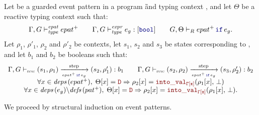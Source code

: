 \begin{skippableproof}
    Let  be a guarded event pattern in a program \G and typing
    context \tyCtx, and let $\Theta$ be a reactive typing context such that:
    \begin{equation*}
        \epatTyped{epat^+} \qquad \exprTyped{e_g}{\kwf{bool}} \qquad \epatTypedReact{\Theta}{\guarded{epat^+}{e_g}}.
    \end{equation*}
    Let $\rho_1$, $\rho'_1$, $\rho_2$ and $\rho'_2$ be contexts, let $s_1$, $s_2$ and $s_3$ be
    states corresponding to , and let $b_1$ and $b_2$ be booleans such that:
    \begin{equation*}
        \begin{array}{c}
            \epatOpsem{\rho_1}{s_1}{\guarded{epat^+}{e_g}}{s_2}{b_1}{\rho'_1} \qquad \epatOpsem{\rho_2}{s_2}{\guarded{epat^+}{e_g}}{s_3}{b_2}{\rho'_2} \\
            \forall x \in \deps{epat^+}, \; \Theta[x] = \dType \Rightarrow \rho_2[x] = \intoVal{\tyCtx[x]}{\rho_1[x]}{\bot}                            \\
            \forall x \in \deps{e_g} \backslash \defs{pat^+}, \; \Theta[x] = \dType \Rightarrow \rho_2[x] = \intoVal{\tyCtx[x]}{\rho_1[x]}{\bot}.
        \end{array}
    \end{equation*}

    We proceed by structural induction on event patterns.


\end{skippableproof}
